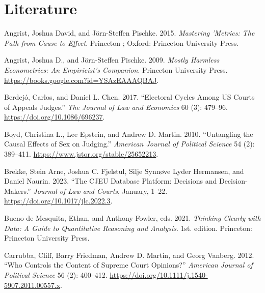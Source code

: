 \documentclass[
  11pt,
]{article}
\newlength{\cslhangindent}
\newenvironment{CSLReferences}[2] %
 {%
  \setlength{\parindent}{0pt}
  \ifodd #1 \everypar{\setlength{\hangindent}{\cslhangindent}}\ignorespaces\fi
  \ifnum #2 > 0
  \setlength{\parskip}{#2\baselineskip}
  \fi
 }%
 {}
\begin{document}
\vspace{25pt}

\hypertarget{literature}{%
\section*{Literature}\label{literature}}

\hypertarget{refs}{}
\begin{CSLReferences}{1}{0}
\leavevmode{}%
Angrist, Joshua David, and Jörn-Steffen Pischke. 2015. \emph{Mastering
'Metrics: The Path from Cause to Effect}. {Princeton ; Oxford}:
{Princeton University Press}.

\leavevmode{}%
Angrist, Joshua D., and Jörn-Steffen Pischke. 2009. \emph{Mostly
{Harmless Econometrics}: {An Empiricist}'s {Companion}}. {Princeton
University Press}. \url{https://books.google.com?id=YSAzEAAAQBAJ}.

\leavevmode{}%
Berdejó, Carlos, and Daniel L. Chen. 2017. {``Electoral {Cycles} Among
{US Courts} of {Appeals Judges}.''} \emph{The Journal of Law and
Economics} 60 (3): 479--96. \url{https://doi.org/10.1086/696237}.

\leavevmode{}%
Boyd, Christina L., Lee Epstein, and Andrew D. Martin. 2010.
{``Untangling the {Causal Effects} of {Sex} on {Judging}.''}
\emph{American Journal of Political Science} 54 (2): 389--411.
\url{https://www.jstor.org/stable/25652213}.

\leavevmode{}%
Brekke, Stein Arne, Joshua C. Fjelstul, Silje Synnøve Lyder Hermansen,
and Daniel Naurin. 2023. {``The {CJEU Database Platform}: {Decisions}
and {Decision-Makers}.''} \emph{Journal of Law and Courts}, January,
1--22. \url{https://doi.org/10.1017/jlc.2022.3}.

\leavevmode{}%
Bueno de Mesquita, Ethan, and Anthony Fowler, eds. 2021. \emph{Thinking
Clearly with Data: A Guide to Quantitative Reasoning and Analysis}. 1st.
edition. {Princeton}: {Princeton University Press}.

\leavevmode{}%
Carrubba, Cliff, Barry Friedman, Andrew D. Martin, and Georg Vanberg.
2012. {``Who {Controls} the {Content} of {Supreme Court Opinions}?''}
\emph{American Journal of Political Science} 56 (2): 400--412.
\url{https://doi.org/10.1111/j.1540-5907.2011.00557.x}.


\end{CSLReferences}
\end{document}
